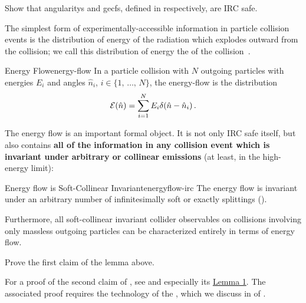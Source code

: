 \begin{exercise}{}
    Show that \glspl{angularity} and \glspl{gecf}, defined in  respectively, are IRC safe.
\end{exercise}



The simplest form of experimentally-accessible information in particle collision events is the distribution of energy of the radiation which explodes outward from the collision;
%
we call this distribution of energy the  of the collision~\cite{Sterman:1975xv, Basham:1977iq, Basham:1978bw, Basham:1978zq, Basham:1979gh,Tamis:2023guc,Mazzilli:2024ots,CMS:2024mlf}.
\begin{definitionbox}{Energy Flow}{energy-flow}
    In a particle collision with \(N\) outgoing particles with energies \(E_i\) and angles \(\hat n_i\), \(i \in \{1,\,\ldots,\,N\}\), the \gls{energy-flow} is the distribution
    \begin{equation}
      \label{eq:energy-flow}
      \mc E(\hat n) = \sum_{i=1}^N E_i \delta(\hat n - \hat n_i)
      \,.
    \end{equation}

\end{definitionbox}

The energy flow is an important formal object.
%
It is not only IRC safe itself, but also contains \textbf{all of the information in any collision event which is invariant under arbitrary  or collinear emissions} (at least, in the high-energy limit):

\begin{lemma}{Energy flow is Soft-Collinear Invariant}{energyflow-irc}
    The energy flow is invariant under an arbitrary number of infinitesimally soft or exactly  splittings ().

    Furthermore, all soft-collinear invariant collider observables on collisions involving only massless outgoing particles can be characterized entirely in terms of energy flow.
\end{lemma}


\begin{exercise}
    Prove the first claim of the lemma above.
\end{exercise}

For a proof of the second claim of , see  and especially its \href{https://arxiv.org/pdf/2004.04159\#lemma.1}{Lemma 1}.
%
The associated proof requires the technology of the , which we discuss in  of .



